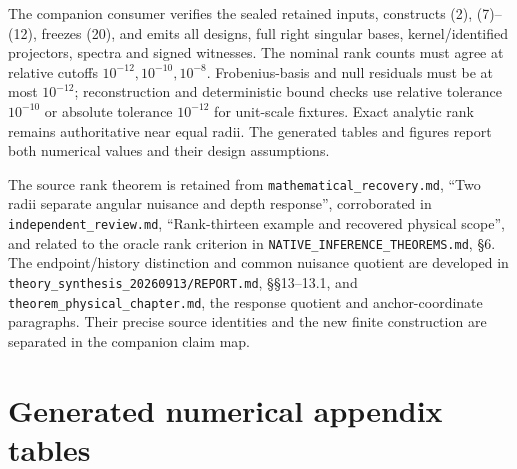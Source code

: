 The companion consumer verifies the sealed retained inputs, constructs (2), (7)--(12), freezes (20), and emits all designs, full right singular bases, kernel/identified projectors, spectra and signed witnesses. The nominal rank counts must agree at relative cutoffs \(10^{-12},10^{-10},10^{-8}\). Frobenius-basis and null residuals must be at most \(10^{-12}\); reconstruction and deterministic bound checks use relative tolerance \(10^{-10}\) or absolute tolerance \(10^{-12}\) for unit-scale fixtures. Exact analytic rank remains authoritative near equal radii. The generated tables and figures report both numerical values and their design assumptions.

The source rank theorem is retained from \texttt{mathematical\_recovery.md}, ``Two radii separate angular nuisance and depth response'', corroborated in \texttt{independent\_review.md}, ``Rank-thirteen example and recovered physical scope'', and related to the oracle rank criterion in \texttt{NATIVE\_INFERENCE\_THEOREMS.md}, §6. The endpoint/history distinction and common nuisance quotient are developed in \texttt{theory\_synthesis\_20260913/REPORT.md}, §§13--13.1, and \texttt{theorem\_physical\_chapter.md}, the response quotient and anchor-coordinate paragraphs. Their precise source identities and the new finite construction are separated in the companion claim map.

\hypertarget{generated-numerical-appendix-tables}{%
\section{Generated numerical appendix tables}\label{generated-numerical-appendix-tables}}

